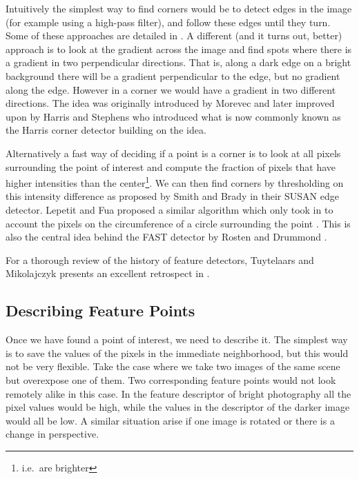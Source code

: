 Intuitively the simplest way to find corners would be to detect edges in 
the image (for example using a high-pass filter), and follow these edges 
until they turn. Some of these approaches are detailed in 
\cite{university1978comparison}. A different (and it turns out, better) 
approach is to look at the gradient across the image and find spots 
where there is a gradient in two perpendicular directions.  That is, 
along a dark edge on a bright background there will be a gradient 
perpendicular to the edge, but no gradient along the edge.  However in a 
corner we would have a gradient in two different directions. The idea 
was originally introduced by Morevec \cite{hans1977towards} and later 
improved upon by Harris and Stephens who introduced what is now commonly 
known as the Harris corner detector \cite{harris1988combined} building 
on the idea.

Alternatively a fast way of deciding if a point is a corner is to look 
at all pixels surrounding the point of interest and compute the fraction 
of pixels that have higher intensities than the center\footnote{i.e.\ 
are brighter}. We can then find corners by thresholding on this 
intensity difference as proposed by Smith and Brady 
\cite{smith1997susan} in their SUSAN edge detector. Lepetit and Fua 
proposed a similar algorithm which only took in to account the pixels on 
the circumference of a circle surrounding the point 
\cite{lepetit2006keypoint}. This is also the central idea behind the 
FAST detector by Rosten and Drummond \cite{rosten2006machine}.

For a thorough review of the history of feature detectors, Tuytelaars 
and Mikolajczyk presents an excellent retrospect in 
\cite{tuytelaars2008local}.

\subsection{Describing Feature Points}

Once we have found a point of interest, we need to describe it. The 
simplest way is to save the values of the pixels in the immediate 
neighborhood, but this would not be very flexible. Take the case where 
we take two images of the same scene but overexpose one of them. Two 
corresponding feature points would not look remotely alike in this case.
In the feature descriptor of bright photography all the pixel values 
would be high, while the values in the descriptor of the darker image 
would all be low. A similar situation arise if one image is rotated or 
there is a change in perspective.

